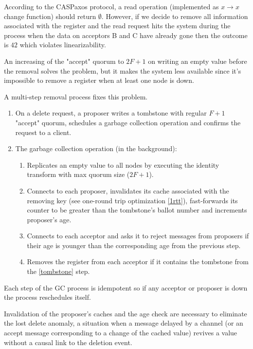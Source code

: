 \documentclass[12pt]{article}
\theoremstyle{definition}
\begin{document}
According to the CASPaxos protocol, a read operation (implemented as $x \to x$ change function) should return $\emptyset$. However, if we decide to remove all information associated with the register and the read request hits the system during the process when the data on acceptors B and C have already gone then the outcome is $42$ which violates linearizability.

An increasing of the "accept" quorum to $2F+1$ on writing an empty value before the removal solves the problem, but it makes the system less available since it's impossible to remove a register when at least one node is down.

A multi-step removal process fixes this problem.

\begin{enumerate}
  \item On a delete request, a proposer writes a tombstone with regular $F+1$ "accept" quorum, schedules a garbage collection operation and confirms the request to a client.
  \item The garbage collection operation (in the background):\label{GC}
  \begin{enumerate}
    \item Replicates an empty value to all nodes by executing the identity transform with max quorum size ($2F+1$).\label{tombstone}
    \item Connects to each proposer, invalidates its cache associated with the removing key (see one-round trip optimization \ref{1rtt}), fast-forwards its counter to be greater than the tombstone's ballot number and increments proposer's age.
    \item Connects to each acceptor and asks it to reject messages from proposers if their age is younger than the corresponding age from the previous step.
    \item Removes the register from each acceptor if it contains the tombstone from the \ref{tombstone} step.
  \end{enumerate}
\end{enumerate}

Each step of the GC process is idempotent so if any acceptor or proposer is down the process reschedules itself.

Invalidation of the proposer's caches and the age check are necessary to eliminate the lost delete anomaly, a situation when a message delayed by a channel (or an accept message corresponding to a change of the cached value) revives a value without a causal link to the deletion event.
\end{document}
